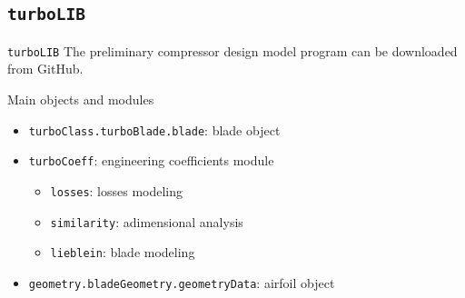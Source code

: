 \subsection{\texttt{turboLIB}}
	\begin{frame}[fragile]{\texttt{turboLIB}}
		The preliminary compressor design model program \href{https://github.com/antoniopucciarelli/turboLIB}{} can be downloaded from GitHub.
		\begin{block}{Main objects and modules}
			\begin{itemize}
				\item \verb|turboClass.turboBlade.blade|: blade object
				\item \verb|turboCoeff|: engineering coefficients module
					\begin{itemize}
						\item \verb|losses|: losses modeling 
						\item \verb|similarity|: adimensional analysis
						\item \verb|lieblein|: blade modeling
					\end{itemize}
				\item \verb|geometry.bladeGeometry.geometryData|: airfoil object
			\end{itemize}
		\end{block}
	\end{frame}

